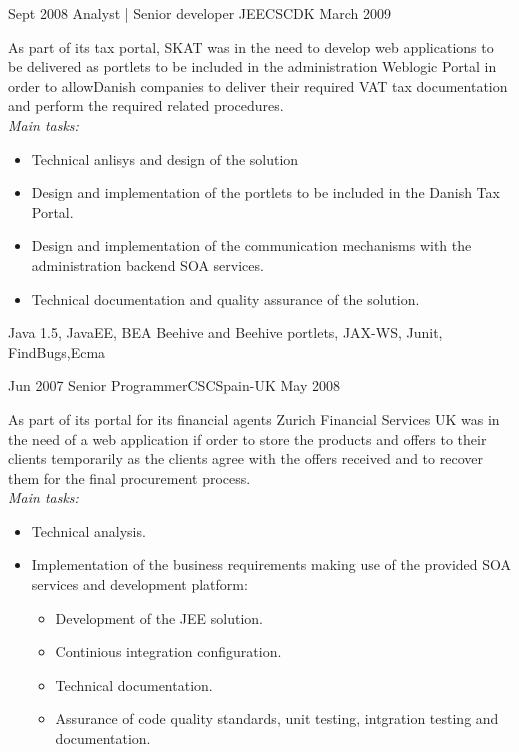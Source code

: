 \begin{experiences}
  \emptySeparator

  \experience
    {Sept 2008}     {Analyst | Senior developer JEE}{CSC}{DK}
    {March 2009}    {

As part of its tax portal, SKAT was in the need to develop web applications to be delivered as
portlets to be included in the administration Weblogic Portal in order to allowDanish
companies to deliver their required VAT tax documentation and perform the required related
procedures.    
\\
\emph{Main tasks:}        
                      \begin{itemize}
                        \item Technical anlisys and design of the solution	
                        \item Design and implementation of the portlets to be included in the Danish Tax Portal.	                
                        \item Design and implementation of the communication mechanisms with the administration backend SOA services.
                        \item Technical documentation and quality assurance of the solution.
                      \end{itemize}
                    }
                    {Java 1.5, JavaEE, BEA Beehive and Beehive portlets, JAX-WS, Junit, FindBugs,Ecma}
  
  
  
  \emptySeparator
  
  
  
  \experience
  {Jun 2007}       {Senior Programmer}{CSC}{Spain-UK}
  {May 2008}   {
  
  As part of its portal for its financial agents Zurich Financial Services UK was in the need of a web application if order to store the products and offers to their clients temporarily as the clients agree with the offers received and to recover them for the final procurement process.
\\
\emph{Main tasks:}  
                      \begin{itemize}
                        
                        \item Technical analysis. 

                        \item Implementation of the business requirements making use of the provided SOA services and development platform:
                        \begin{itemize}
                          \item Development of the JEE solution.
                          \item Continious integration configuration.
                          \item Technical documentation.
                          \item Assurance of code quality standards, unit testing, intgration testing and documentation. 
                        \end{itemize}


\end{itemize}}
\end{experiences}
